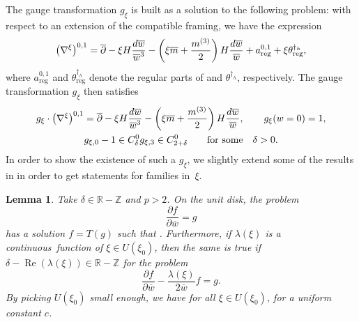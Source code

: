 \documentclass[11pt]{article}
\numberwithin{equation}{section}
\newtheorem{Lemma}[Theorem]{Lemma}
\numberwithin{equation}{section}
\begin{document}
The gauge transformation $g_\xi$ is built as a solution to the following problem: with respect to an extension of the compatible framing, we have the expression
\begin{equation*}
 \bigl(\nabla^{\xi}\bigr)^{0,1}=\overline{\partial} -\xi H\frac{{\rm d}\overline{w}}{\overline{w}^3} - \left(\xi\overline{m}+ \frac{m^{(3)}}{2}\right)H\frac{{\rm d}\overline{w}}{\overline{w}} + a_{\text{reg}}^{0,1}+\xi \theta_{\text{reg}}^{\dagger_h},
\end{equation*}
where $a_{\text{reg}}^{0,1}$ and $\theta_{\text{reg}}^{\dagger_h}$ denote the regular parts of  and $\theta^{\dagger_h}$, respectively. The gauge transformation $g_{\xi}$ then satisfies
\begin{gather}
 g_{\xi}\cdot \bigl(\nabla^{\xi}\bigr)^{0,1}=\overline{\partial} -\xi H\frac{{\rm d}\overline{w}}{\overline{w}^3} - \left(\xi\overline{m}+ \frac{m^{(3)}}{2}\right)H\frac{{\rm d}\overline{w}}{\overline{w}},\qquad
 g_{\xi}(w=0)=1,\nonumber\\
 g_{\xi,0}-1\in C^0_{\delta} g_{\xi,3} \in C^0_{2+\delta} \qquad \text{for some}\quad \delta>0.\label{problem}
\end{gather}
In order to show the existence of such a $g_{\xi}$, we slightly extend some of the results in \cite[Section~7]{BB04} in order to get statements for families in~$\xi$.

\begin{Lemma} \label{BBext} Take $\delta \in \mathbb{R}-\mathbb{Z}$ and $p>2$. On the unit disk, the problem
\begin{equation}\label{1CR}
 \frac{\partial f}{\partial \overline{w}} = g
\end{equation}
has a solution $f=T(g)$ such that . Furthermore, if $\lambda(\xi)$ is a continuous~function of $\xi \in U(\xi_0)$, then the same is true if $\delta - \operatorname{Re}(\lambda(\xi)) \in \mathbb{R}-\mathbb{Z}$ for the problem%
\begin{equation}\label{2CR}
 \frac{\partial f}{\partial \overline{w}} -\frac{\lambda(\xi)}{2\overline{w}}f = g.
\end{equation}
By picking $U(\xi_0)$ small enough, we have  for all $\xi \in U(\xi_0)$, for a uniform constant $c$.
\end{Lemma}
\end{document}

